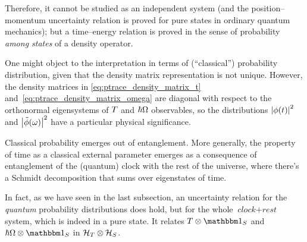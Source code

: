 Therefore, it cannot be studied as an independent system
(and the position--momentum uncertainty relation is proved
for pure states in ordinary quantum mechanics); but a
time--energy relation is proved in the sense of probability
\emph{among states} of a density operator.

One might object to the interpretation in terms of (``classical'')
probability distribution, given
that the density matrix representation is
not unique.
However, the density matrices
in \eqref{eq:ptrace_density_matrix_t} and~\eqref{eq:ptrace_density_matrix_omega}
are diagonal with respect to
the orthonormal eigensystems of ${T}$ and $\hbar {\Omega}$ observables,
so the distributions $\abs{\phi(t)}^2$ and $\abs{\tilde{\phi}(\omega)}^2$
have a particular physical significance.

Classical probability emerges out of entanglement. More generally,
the property of time as a classical external parameter emerges as
a consequence of entanglement of the (quantum) clock
with the rest of the universe, where there's a Schmidt decomposition
that sums over eigenstates of time.

In fact, as we have seen in the last subsection,
an uncertainty relation for the \emph{quantum} probability distributions does hold,
but for the whole
$\textit{clock} + \textit{rest}$ system, which is indeed in a pure state.
It relates $\op{T}\ox\idop_S$ and $\hbar\op{\Omega}\ox\idop_S$
in $\mathcal{H}_T \otimes \mathcal{H}_S$.
